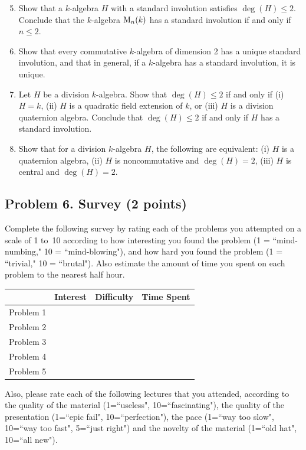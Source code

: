 \documentclass[11pt]{article}
\theoremstyle{definition}
\begin{document}
\begin{enumerate}[{\bf (a)}]
\setcounter{enumi}{4}
\item Show that a $k$-algebra $H$ with a standard involution satisfies $\deg(H)\le 2$.
Conclude that the $k$-algebra ${\rm M}_n(k)$ has a standard involution if and only if $n\le 2$.
\item Show that every commutative $k$-algebra of dimension 2 has a unique standard involution, and that in general, if a $k$-algebra has a standard involution, it is unique.
\item Let $H$ be a division $k$-algebra.  Show that $\deg(H)\le 2$ if and only if (i) $H=k$, (ii) $H$ is a quadratic field extension of $k$, or (iii) $H$ is a division quaternion algebra.
Conclude that $\deg(H)\le 2$ if and only if $H$ has a standard involution.

\item Show that for a division $k$-algebra $H$, the following are equivalent: (i) $H$ is a quaternion algebra, (ii) $H$ is noncommutative and $\deg(H)=2$, (iii) $H$ is central and $\deg(H)=2$.
\end{enumerate}

\noindent

\subsection*{Problem 6. Survey (2 points)}

Complete the following survey by rating each of the problems you attempted on a scale of 1 to~10 according to how interesting you found the problem (1 = ``mind-numbing," 10 = ``mind-blowing"), and how hard you found the problem (1 = ``trivial," 10 = ``brutal").  Also estimate the amount of time you spent on each problem to the nearest half hour.

\begin{center}
\begin{tabular}{l|r|r|r|}
& Interest & Difficulty & Time Spent\\\hline
Problem 1 & & & \\\hline
Problem 2 & & & \\\hline
Problem 3 & & & \\\hline
Problem 4 & & & \\\hline
Problem 5 & & & \\\hline
\end{tabular}
\end{center}
\noindent
Also, please rate each of the following lectures that you attended, according to the quality of the material (1=``useless", 10=``fascinating"), the quality of the presentation (1=``epic fail", 10=``perfection"), the pace (1=``way too slow", 10=``way too fast", 5=``just right") and the novelty of the material (1=``old hat", 10=``all new").
\end{document}
